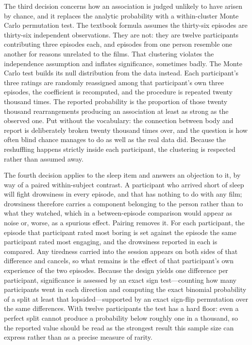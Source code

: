 The third decision concerns how an association is judged unlikely to have arisen by chance, and
it replaces the analytic probability with a within-cluster Monte Carlo permutation test. The textbook
formula assumes the thirty-six episodes are thirty-six independent observations. They are not:
they are twelve participants contributing three episodes each, and episodes from one person
resemble one another for reasons unrelated to the films. That clustering violates the
independence assumption and inflates significance, sometimes badly. The Monte Carlo test builds
its null distribution from the data instead. Each participant's three ratings are randomly
reassigned among that participant's own three episodes, the coefficient is recomputed, and the
procedure is repeated twenty thousand times. The reported probability is the proportion of those
twenty thousand rearrangements producing an association at least as strong as the observed one.
Put without the vocabulary: the connection between body and report is deliberately broken twenty
thousand times over, and the question is how often blind chance manages to do as well as the
real data did. Because the reshuffling happens strictly inside each participant, the clustering
is respected rather than assumed away.

The fourth decision applies to the sleep item and answers an objection to it, by way of a paired
within-subject contrast. A participant who arrived short of sleep will fight drowsiness in every
episode, and that has nothing to do with any film; drowsiness therefore carries a component
belonging to the person rather than to what they watched, which in a between-episode comparison
would appear as noise or, worse, as a spurious effect. Pairing removes it. For each participant,
the episode that participant rated most boring is set against the episode the same participant
rated most engaging, and the drowsiness reported in each is compared. Any tiredness carried into
the session appears on both sides of that difference and cancels, so what remains is the effect
of that participant's own experience of the two episodes. Because the design yields one
difference per participant, significance is assessed by an exact sign test---counting how many
participants went in each direction and computing the exact binomial probability of a split at
least that lopsided---supported by an exact sign-flip permutation over the same differences.
With twelve participants the test has a hard floor: even a perfect split cannot produce a
probability below roughly one in a thousand, so the reported value should be read as the
strongest result this sample size can express rather than as a precise measure of rarity.

